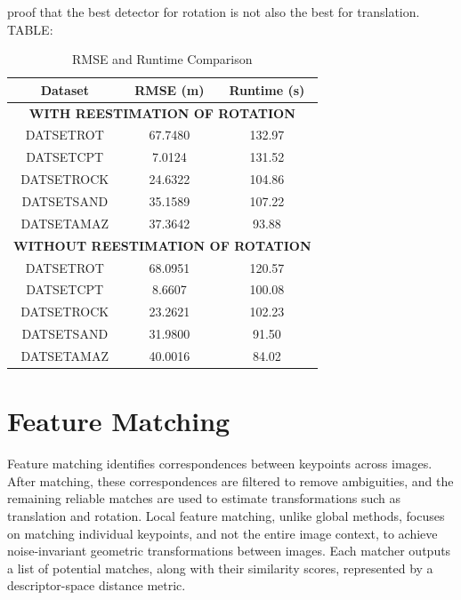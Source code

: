 proof that the best detector for rotation is not also the best for translation.
TABLE:
\begin{table}[H]
    \centering
    \caption{RMSE and Runtime Comparison}
    \label{tab:rot_reestimation}
    \begin{tabular}{|c|c|c|}
    \hline
    \textbf{Dataset} & \textbf{RMSE (m)} & \textbf{Runtime (s)} \\ \hline
    \multicolumn{3}{|c|}{\textbf{WITH REESTIMATION OF ROTATION}} \\ \hline
    DATSETROT       & 67.7480           & 132.97               \\ \hline
    DATSETCPT       & 7.0124            & 131.52               \\ \hline
    DATSETROCK      & 24.6322           & 104.86               \\ \hline
    DATSETSAND      & 35.1589           & 107.22               \\ \hline
    DATSETAMAZ      & 37.3642           & 93.88                \\ \hline
    \multicolumn{3}{|c|}{\textbf{WITHOUT REESTIMATION OF ROTATION}} \\ \hline
    DATSETROT       & 68.0951           & 120.57               \\ \hline
    DATSETCPT       & 8.6607            & 100.08               \\ \hline
    DATSETROCK      & 23.2621           & 102.23               \\ \hline
    DATSETSAND      & 31.9800           & 91.50                \\ \hline
    DATSETAMAZ      & 40.0016           & 84.02                \\ \hline
    \end{tabular}
    \end{table}
    



\section*{Feature Matching}
Feature matching identifies correspondences between keypoints across images. After matching, these correspondences are filtered to remove ambiguities, and the remaining reliable matches are used to estimate transformations such as translation and rotation. Local feature matching, unlike global methods, focuses on matching individual keypoints, and not the entire image context, to achieve noise-invariant geometric transformations between images.
Each matcher outputs a list of potential matches, along with their similarity scores, represented by a descriptor-space distance metric.


